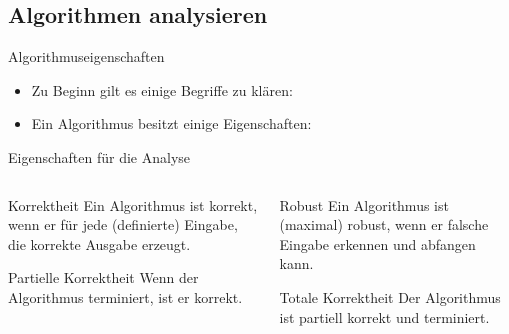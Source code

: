\documentclass[aspectratio=169,usepdftitle=true,t]{beamer}
\newcommand\twosplit[3][t]{%
    \begin{columns}[#1]
    \begin{column}{0.475\linewidth}
        #2
    \end{column}\hfill
    \begin{column}{0.475\linewidth}
        #3
    \end{column}
    \end{columns}
}
\begin{document}
\subsection{Algorithmen analysieren}
\begin{frame}{Algorithmuseigenschaften}
    \begin{itemize}
        \item Zu Beginn gilt es einige Begriffe zu klären: 
        \item Ein Algorithmus besitzt einige Eigenschaften: 
    \end{itemize}
\end{frame}

\begin{frame}[c]{Eigenschaften für die Analyse}
    \twosplit{%
    \begin{block}{Korrektheit}
        Ein Algorithmus ist korrekt, wenn er für jede (definierte) Eingabe, die korrekte Ausgabe erzeugt.
    \end{block}
    \begin{block}{Partielle Korrektheit}
        Wenn der Algorithmus terminiert, ist er korrekt.
    \end{block}
    }{%
    \begin{block}{Robust}
        Ein Algorithmus ist (maximal) robust, wenn er falsche Eingabe erkennen und abfangen kann.
    \end{block}
    \begin{block}{Totale Korrektheit}
        Der Algorithmus ist partiell korrekt und terminiert.
    \end{block}
    }
\end{frame}
\end{document}
